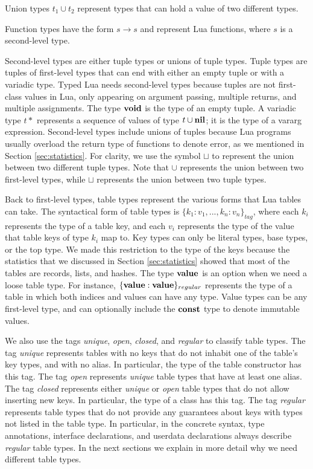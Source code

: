 Union types $t_{1} \cup t_{2}$ represent types that can hold a value
of two different types.

Function types have the form $s \rightarrow s$ and represent Lua functions,
where $s$ is a second-level type.

Second-level types are either tuple types or unions of tuple types.
Tuple types are tuples of first-level types that can end with
either an empty tuple or with a variadic type.
Typed Lua needs second-level types because tuples are not first-class
values in Lua, only appearing on argument passing, multiple returns,
and multiple assignments.
The type $\mathbf{void}$ is the type of an empty tuple.
A variadic type $t*$ represents a sequence of values of type $t \cup \mathbf{nil}$;
it is the type of a vararg expression.
Second-level types include unions of tuples because Lua programs
usually overload the return type of functions to denote error,
as we mentioned in Section \ref{sec:statistics}.
For clarity, we use the symbol $\sqcup$ to represent the union between
two different tuple types.
Note that $\cup$ represents the union between two first-level types,
while $\sqcup$ represents the union between two tuple types.

Back to first-level types, table types represent the various forms
that Lua tables can take.
The syntactical form of table types is $\{ k_{1}{:}v_{1}, ..., k_{n}{:}v_{n} \}_{tag}$,
where each $k_{i}$ represents the type of a table key,
and each $v_{i}$ represents the type of the value that table keys of type $k_{i}$ map to.
Key types can only be literal types, base types, or the top type.
We made this restriction to the type of the keys because the statistics
that we discussed in Section \ref{sec:statistics} showed that most
of the tables are records, lists, and hashes.
The type $\mathbf{value}$ is an option when we need a loose table type.
For instance, $\{\mathbf{value}:\mathbf{value}\}_{regular}$ represents the type of a
table in which both indices and values can have any type.
Value types can be any first-level type, and can optionally include
the $\mathbf{const}$ type to denote immutable values.

We also use the tags \emph{unique}, \emph{open}, \emph{closed}, and
\emph{regular} to classify table types.
The tag \emph{unique} represents tables with no keys that do not
inhabit one of the table's key types, and with no alias.
In particular, the type of the table constructor has this tag.
The tag \emph{open} represents \emph{unique} table types that
have at least one alias.
The tag \emph{closed} represents either \emph{unique} or \emph{open}
table types that do not allow inserting new keys. 
In particular, the type of a class has this tag.
The tag \emph{regular} represents table types that do not provide
any guarantees about keys with types not listed in the table type.
In particular, in the concrete syntax, type annotations, interface
declarations, and userdata declarations always describe \emph{regular} table types.
In the next sections we explain in more detail why we need
different table types.

